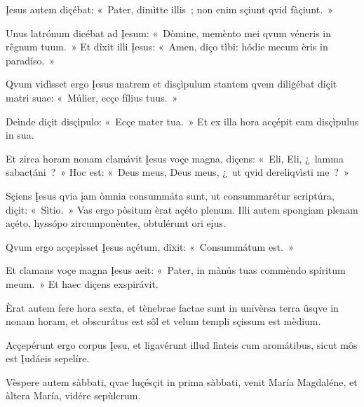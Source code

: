 Įesus autem diçébat: «~Pater, dimìtte illis~; non enim sçiunt qvid fàçiunt.~» 

Unus latrónum dicébat ad Įesum: «~Dòmine, memènto mei qvum véneris in rêgnum tuum.~» Et dîxit illi Įesus: «~Amen, diço tìbi: hódie mecum èris in paradíso.~» 

Qvum vidìsset ergo Įesus matrem et disçìpulum stantem qvem diliģébat diçit matri suae: «~Múlier, ecçe fílius tuus.~» 

Deìnde diçit disçìpulo: «~Ecçe mater tua.~» Et ex illa hora acçépit eam disçìpulus in sua. 

Et zirca horam nonam clamávit Įesus voçe magna, diçens: «~Eli, Eli, ¿~lamma sabacțáni~?~» Hoc est: «~Deus meus, Deus meus, ¿~ut qvid dereliqvìsti me~?~» 

Sçiens Įesus qvia įam òmnia consummáta sunt, ut consummarétur scriptúra, diçit: «~Sìtio.~» Vas ergo pòsitum èrat açéto plenum. Illi autem spongiam plenam açéto, hyssópo zircumponèntes, obtulérunt ori eįus. 

Qvum ergo acçepìsset Įesus açétum, dîxit: «~Consummátum est.~» 

Et clamans voçe magna Įesus aeit: «~Pater, in mànůs tuas commèndo spíritum meum.~» Et haec diçens exspirávit. 

Èrat autem fere hora sexta, et tènebrae factae sunt in univèrsa terra ûsqve in nonam horam, et obscurátus est sôl et velum templi sçissum est mèdium. 

Acçepérunt ergo corpus Įesu, et ligavérunt illud lìnteis cum aromátibus, sicut môs est Įudáeis sepelíre. 


Vèspere autem sàbbati, qvae luçésçit in prima sàbbati, venit María Magdaléne, et àltera María, vidére sepùlcrum. 

